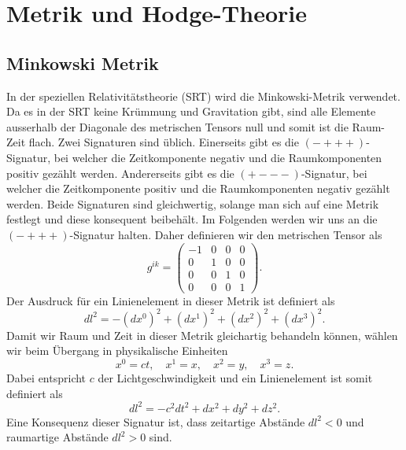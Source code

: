 %
%
%
%
\section{Metrik und Hodge-Theorie 
\label{maxwell:section:teil1}}

\subsection{Minkowski Metrik}
In der speziellen Relativitätstheorie (SRT) wird die Minkowski-Metrik verwendet.
Da es in der SRT keine Krümmung und Gravitation gibt, sind alle Elemente ausserhalb der Diagonale des metrischen Tensors null und somit ist die Raum-Zeit flach.
Zwei Signaturen sind üblich.
Einerseits gibt es die $({-}{+}{+}{+})$-Signatur, bei welcher die Zeitkomponente negativ und die Raumkomponenten positiv gezählt werden.
Andererseits gibt es die $({+}{-}{-}{-})$-Signatur, bei welcher die Zeitkomponente positiv und die Raumkomponenten negativ gezählt werden.
Beide Signaturen sind gleichwertig, solange man sich auf eine Metrik festlegt und diese konsequent beibehält.
Im Folgenden werden wir uns an die $({-}{+}{+}{+})$-Signatur halten.
Daher definieren wir den metrischen Tensor als
\begin{equation}
	g^{ik} = \begin{pmatrix}
		-1 & 0 & 0 & 0 \\ 0 & 1 & 0 & 0 \\ 0 & 0 & 1 & 0 \\ 0 & 0 & 0 & 1 
	\end{pmatrix}.
	\label{maxwell:section:teil1:metrik}
\end{equation}
Der Ausdruck für ein Linienelement in dieser Metrik ist definiert als
\begin{equation*}
	dl^2 = -(dx^0)^2 +(dx^1)^2+(dx^2)^2+(dx^3)^2.
\end{equation*}
Damit wir Raum und Zeit in dieser Metrik gleichartig behandeln können, wählen wir beim Übergang in physikalische Einheiten 
\[
x^0 = ct,\quad x^1 = x,\quad x^2 = y, \quad x^3 = z .
\]
Dabei entspricht $c$ der Lichtgeschwindigkeit und ein Linienelement ist somit definiert als
\begin{equation*}
	dl^2 = -c^2dt^2 +dx^2+dy^2+dz^2.
\end{equation*}
Eine Konsequenz dieser Signatur ist, dass zeitartige Abstände $dl^2 < 0$ und raumartige Abstände $dl^2 > 0$ sind.
